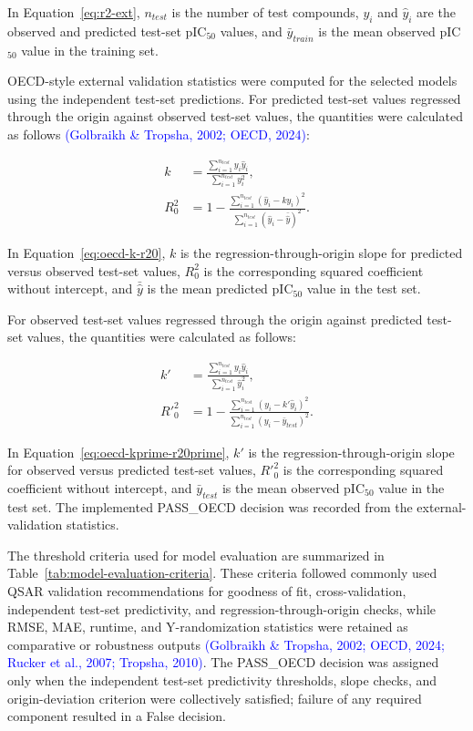 \documentclass[11pt]{article}
\begin{document}
In Equation~\ref{eq:r2-ext}, $n_{test}$ is the number of test compounds, $y_i$ and $\hat{y}_i$ are the observed and predicted test-set pIC$_{50}$ values, and $\bar{y}_{train}$ is the mean observed pIC$_{50}$ value in the training set.

OECD-style external validation statistics were computed for the selected models using the independent test-set predictions. For predicted test-set values regressed through the origin against observed test-set values, the quantities were calculated as follows \textcolor{blue}{(Golbraikh \& Tropsha, 2002; OECD, 2024)}:

\begin{equation}
\begin{aligned}
k &= \frac{\sum_{i=1}^{n_{test}} y_i\hat{y}_i}{\sum_{i=1}^{n_{test}} y_i^2}, \\[4pt]
R^2_0 &= 1 - \frac{\sum_{i=1}^{n_{test}}(\hat{y}_i - k y_i)^2}{\sum_{i=1}^{n_{test}}(\hat{y}_i - \bar{\hat{y}})^2}.
\end{aligned}
\label{eq:oecd-k-r20}
\end{equation}

In Equation~\ref{eq:oecd-k-r20}, $k$ is the regression-through-origin slope for predicted versus observed test-set values, $R^2_0$ is the corresponding squared coefficient without intercept, and $\bar{\hat{y}}$ is the mean predicted pIC$_{50}$ value in the test set.

For observed test-set values regressed through the origin against predicted test-set values, the quantities were calculated as follows:

\begin{equation}
\begin{aligned}
k' &= \frac{\sum_{i=1}^{n_{test}} y_i\hat{y}_i}{\sum_{i=1}^{n_{test}} \hat{y}_i^2}, \\[4pt]
R'^2_0 &= 1 - \frac{\sum_{i=1}^{n_{test}}(y_i - k'\hat{y}_i)^2}{\sum_{i=1}^{n_{test}}(y_i - \bar{y}_{test})^2}.
\end{aligned}
\label{eq:oecd-kprime-r20prime}
\end{equation}

In Equation~\ref{eq:oecd-kprime-r20prime}, $k'$ is the regression-through-origin slope for observed versus predicted test-set values, $R'^2_0$ is the corresponding squared coefficient without intercept, and $\bar{y}_{test}$ is the mean observed pIC$_{50}$ value in the test set. The implemented PASS\_OECD decision was recorded from the external-validation statistics.

The threshold criteria used for model evaluation are summarized in Table~\ref{tab:model-evaluation-criteria}. These criteria followed commonly used QSAR validation recommendations for goodness of fit, cross-validation, independent test-set predictivity, and regression-through-origin checks, while RMSE, MAE, runtime, and Y-randomization statistics were retained as comparative or robustness outputs \textcolor{blue}{(Golbraikh \& Tropsha, 2002; OECD, 2024; Rucker et al., 2007; Tropsha, 2010)}. The PASS\_OECD decision was assigned only when the independent test-set predictivity thresholds, slope checks, and origin-deviation criterion were collectively satisfied; failure of any required component resulted in a False decision.
\end{document}
